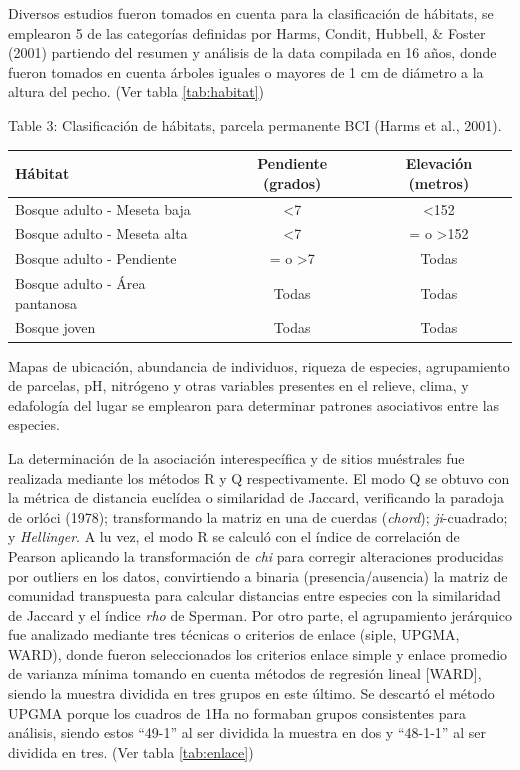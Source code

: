 \documentclass[11pt,]{article}
\begin{document}
Diversos estudios fueron tomados en cuenta para la clasificación de
hábitats, se emplearon 5 de las categorías definidas por Harms, Condit,
Hubbell, \& Foster (2001) partiendo del resumen y análisis de la data
compilada en 16 años, donde fueron tomados en cuenta árboles iguales o
mayores de 1 cm de diámetro a la altura del pecho. (Ver tabla
\ref{tab:habitat})

Table 3: Clasificación de hábitats, parcela permanente BCI (Harms et
al., 2001).\label{tab:habitat}

\begin{longtable}[]{@{}lcc@{}}
\toprule
Hábitat & Pendiente (grados) & Elevación (metros)\tabularnewline
\midrule
\endhead
Bosque adulto - Meseta baja & \textless{}7 &
\textless{}152\tabularnewline
Bosque adulto - Meseta alta & \textless{}7 & = o
\textgreater{}152\tabularnewline
Bosque adulto - Pendiente & = o \textgreater{}7 & Todas\tabularnewline
Bosque adulto - Área pantanosa & Todas & Todas\tabularnewline
Bosque joven & Todas & Todas\tabularnewline
\bottomrule
\end{longtable}

Mapas de ubicación, abundancia de individuos, riqueza de especies,
agrupamiento de parcelas, pH, nitrógeno y otras variables presentes en
el relieve, clima, y edafología del lugar se emplearon para determinar
patrones asociativos entre las especies.

La determinación de la asociación interespecífica y de sitios muéstrales
fue realizada mediante los métodos R y Q respectivamente. El modo Q se
obtuvo con la métrica de distancia euclídea o similaridad de Jaccard,
verificando la paradoja de orlóci (1978); transformando la matriz en una
de cuerdas (\emph{chord}); \emph{ji}-cuadrado; y \emph{Hellinger}. A lu
vez, el modo R se calculó con el índice de correlación de Pearson
aplicando la transformación de \emph{chi} para corregir alteraciones
producidas por outliers en los datos, convirtiendo a binaria
(presencia/ausencia) la matriz de comunidad transpuesta para calcular
distancias entre especies con la similaridad de Jaccard y el índice
\emph{rho} de Sperman. Por otro parte, el agrupamiento jerárquico fue
analizado mediante tres técnicas o criterios de enlace (siple, UPGMA,
WARD), donde fueron seleccionados los criterios enlace simple y enlace
promedio de varianza mínima tomando en cuenta métodos de regresión
lineal {[}WARD{]}, siendo la muestra dividida en tres grupos en este
último. Se descartó el método UPGMA porque los cuadros de 1Ha no
formaban grupos consistentes para análisis, siendo estos ``49-1'' al ser
dividida la muestra en dos y ``48-1-1'' al ser dividida en tres. (Ver
tabla \ref{tab:enlace})
\end{document}
